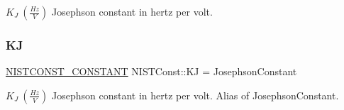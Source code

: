 $K_J \ (\frac{Hz}{V})$ Josephson constant in hertz per volt. \mbox{\label{group___n_i_s_t_const-_josephson_constant_ga85a1a57d5412a21aee60d4e7196c3fc8}} 
\subsubsection{\texorpdfstring{KJ}{KJ}}
{\footnotesize\ttfamily \mbox{\hyperlink{group___n_i_s_t_const-_macros_ga2b0fc1d7452373f816175dd86ce26729}{N\+I\+S\+T\+C\+O\+N\+S\+T\+\_\+\+C\+O\+N\+S\+T\+A\+NT}} N\+I\+S\+T\+Const\+::\+KJ = Josephson\+Constant}

$K_J \ (\frac{Hz}{V})$ Josephson constant in hertz per volt. Alias of Josephson\+Constant. 